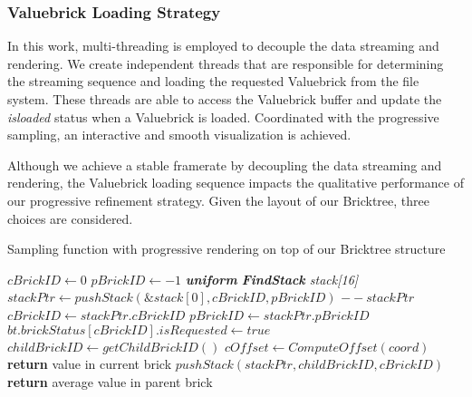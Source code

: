 \subsubsection{Valuebrick Loading Strategy}
In this work, multi-threading is employed to decouple the data streaming and rendering. 
We create independent threads that are responsible for determining the streaming sequence
and loading the requested Valuebrick from the file system. These threads are able to access
the Valuebrick buffer and update the \textit{isloaded} status when a Valuebrick is loaded. 
Coordinated with the progressive sampling, an interactive and smooth visualization is achieved.

Although we achieve a stable framerate by decoupling the data streaming and rendering, the 
Valuebrick loading sequence impacts the qualitative performance of our 
progressive refinement strategy. Given the layout of our Bricktree, three choices are considered.

\begin{algorithm}[t]
	\caption{Sampling function with progressive rendering on top of our Bricktree 
    structure}\label{alg:sample_and_stream}
	\begin{algorithmic}[1]
        	\State $cBrickID\gets \textit{0}$
            \State $pBrickID\gets \textit{$-1$}$
            \State \textit{\textbf{uniform} \textbf{FindStack} stack[16]}
            \State $stackPtr\gets pushStack(\&stack[0], cBrickID, pBrickID)$
            	\State $--stackPtr$
                	\State $cBrickID \gets stackPtr.cBrickID$
                    \State $pBrickID \gets stackPtr.pBrickID$
                    	\State $bt.brickStatus[cBrickID].isRequested \gets true$
                    \EndIf
                		\State $childBrickID \gets getChildBrickID()$
            			\State $cOffset \gets ComputeOffset(coord)$
                			\State \textbf{return} value in current brick
               			\Else
                			\State $pushStack(stackPtr,childBrickID, cBrickID)$
                		\EndIf
                	\Else
                		\State \textbf{return} average value in parent brick
                	\EndIf
                 \EndIf
            \EndWhile
    	\EndProcedure
	\end{algorithmic}
\end{algorithm}


